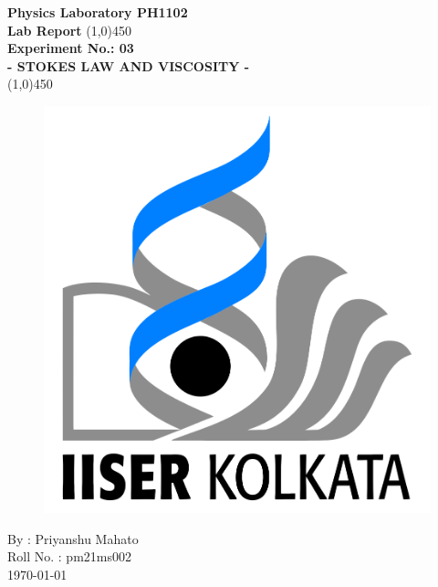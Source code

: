 \documentclass{article}
\begin{document}
	\thispagestyle{empty}
	\begin{titlepage}
		\begin{center}
			\vspace{1cm}
			\Large\textbf{Physics Laboratory PH1102}\\
			\vspace{1cm}
			\large\textbf{Lab Report}
			\vfill%
			\line(1,0){450}\\[16pt]%
			\huge\textbf{Experiment No.: 03}\\[10pt]
			\Large\textbf{- STOKES LAW AND VISCOSITY -}\\[15pt]
			\line(1,0){450}
			\vfill
			\begin{figure}[H]
				\centering
				\includegraphics[scale=0.15]{IISER-K_Logo.png}
			\end{figure}
			By : Priyanshu Mahato\\
			Roll No. : pm21ms002\\
			\today\\
		\end{center}
	\end{titlepage}

	\setcounter{page}{0}
	\tableofcontents
	\pagebreak
\end{document}
